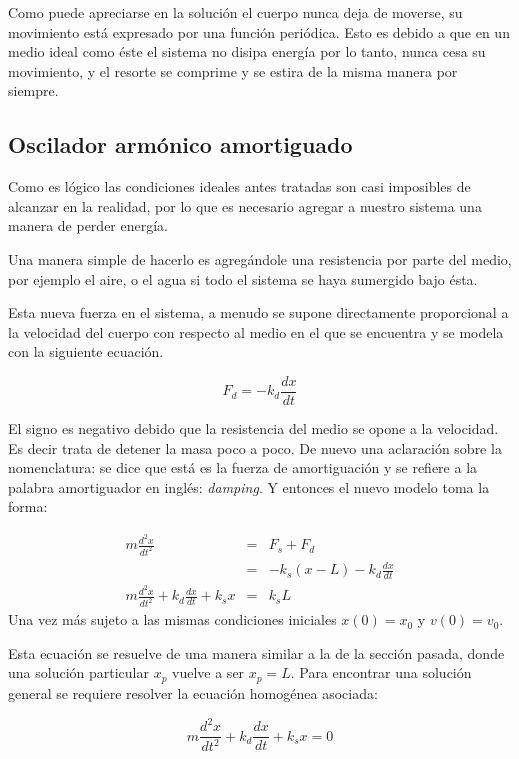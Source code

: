 Como puede apreciarse en la solución el cuerpo nunca deja de moverse, su movimiento está expresado por una función periódica. Esto es debido a que en un medio ideal como éste el sistema no disipa energía por lo tanto, nunca cesa su movimiento, y el resorte se comprime y se estira de la misma manera por siempre.

\subsection{Oscilador armónico amortiguado}

Como es lógico las condiciones ideales antes tratadas son casi imposibles de alcanzar en la realidad, por lo que es necesario agregar a nuestro sistema una manera de perder energía.

Una manera simple de hacerlo es agregándole una resistencia por parte del medio, por ejemplo el aire, o el agua si todo el sistema se haya sumergido bajo ésta. 

Esta nueva fuerza en el sistema, a menudo se supone directamente proporcional a la velocidad del cuerpo con respecto al medio en el que se encuentra y se modela con la siguiente ecuación.

\begin{equation}
F_d = -k_d\frac{dx}{dt}
\end{equation}

El signo es negativo debido que la resistencia del medio se opone a la velocidad. Es decir trata de detener la masa poco a poco. De nuevo una aclaración sobre la nomenclatura: se dice que está es la fuerza de amortiguación y se refiere a la palabra amortiguador en inglés: \foreignlanguage{english}{\emph{damping}}. Y entonces el nuevo modelo toma la forma:

\begin{eqnarray}
m \frac{d^2x}{dt^2} & = & F_s + F_d \nonumber \\
& = & -k_s \left( x - L \right) -k_d\frac{dx}{dt} \nonumber \\
m \frac{d^2x}{dt^2} + k_d\frac{dx}{dt} + k_s x & = & k_s L 
\end{eqnarray}
Una vez más sujeto a las mismas condiciones iniciales $x(0) = x_0$ y $ v(0) = v_0$.

Esta ecuación se resuelve de una manera similar a la de la sección pasada, donde una solución particular $x_p$ vuelve a ser $x_p = L$. Para encontrar una solución general se requiere resolver la ecuación homogénea asociada:

\begin{equation}
m \frac{d^2x}{dt^2} + k_d\frac{dx}{dt} + k_s x = 0
\end{equation}

